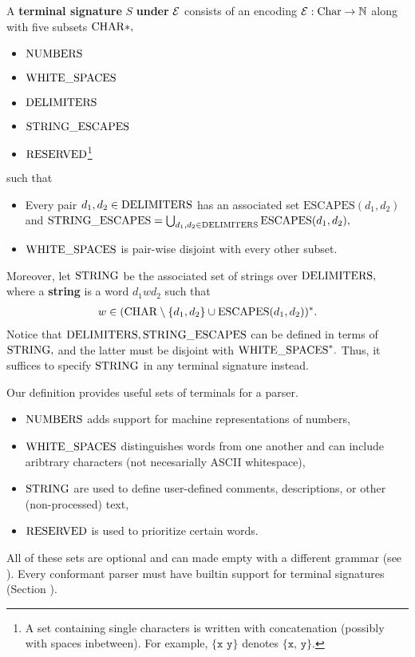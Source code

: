 \begin{definition}
  A \textbf{terminal signature} $S$ \textbf{under} $\mathcal{E}$ consists of an encoding $\mathcal{E}: \textrm{Char} \to \mathbb{N}$ along with five subsets $\mathrm{CHAR}*,$
  \begin{itemize}
  \item $\mathrm{NUMBERS}$
  \item $\mathrm{WHITE\_SPACES}$
  \item $\mathrm{DELIMITERS}$
  \item $\mathrm{STRING\_ESCAPES}$
  \item $\mathrm{RESERVED}$\footnote{A set containing single characters is written with concatenation (possibly with spaces inbetween). For example, $\{\texttt{x y}\}$ denotes $\{\texttt{x, y}\}.$}
  \end{itemize}
  such that
  \begin{itemize}
    \item Every pair $d_{1}, d_{2} \in \mathrm{DELIMITERS}$ has an associated set $\textrm{ESCAPES}(d_{1}, d_{2})$ and
          $\mathrm{STRING\_ESCAPES} = \bigcup_{d_{1}, d_{2} \in \mathrm{DELIMITERS}}\textrm{ESCAPES}(d_{1}, d_{2}),$
    \item $\mathrm{WHITE\_SPACES}$ is pair-wise disjoint with every other subset.
  \end{itemize}

  Moreover, let $\mathrm{STRING}$ be the associated set of strings over $\mathrm{DELIMITERS},$ where a \textbf{string} is a word $d_{1}wd_{2}$ such that
\begin{align*}
w \in (\mathrm{CHAR} \setminus \{d_{1}, d_{2}\} \cup \textrm{ESCAPES}(d_{1}, d_{2}))^*.
\end{align*}
  Notice that $\mathrm{DELIMITERS}, \mathrm{STRING\_ESCAPES}$ can be defined in terms of $\mathrm{STRING},$ and the latter must be disjoint with $\mathrm{WHITE\_SPACES}^{*}.$ Thus, it suffices to specify $\mathrm{STRING}$ in any terminal signature instead.
\end{definition}

Our definition provides useful sets of terminals for a parser.
\begin{itemize}
  \item $\mathrm{NUMBERS}$ adds support for machine representations of numbers,
  \item $\mathrm{WHITE\_SPACES}$ distinguishes words from one another and can include aribtrary characters (not necesarially ASCII whitespace),
  \item $\mathrm{STRING}$ are used to define user-defined comments, descriptions, or other (non-processed) text,
  \item $\mathrm{RESERVED}$ is used to prioritize certain words.
\end{itemize}
All of these sets are optional and can made empty with a different grammar (see \label{section:customization}). Every conformant parser must have builtin support for terminal signatures (Section \label{section:conformance}).



